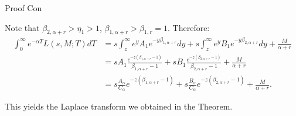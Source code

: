 \documentclass{beamer}
\begin{document}
\begin{frame}{Proof Con}

    {\footnotesize \footnotesize
    \par Note that \(\beta_{2,\alpha+r} > \eta_1 > 1\), \(\beta_{1,\alpha+r} > \beta_{1,r} = 1\). 
    Therefore:
\begin{align*}
\int_{0}^{\infty} e^{-\alpha T} L(s, M; T) dT 
&= s \int_{z}^{\infty} e^{y} A_1 e^{-y\beta_{1,\alpha+r}} dy + s \int_{z}^{\infty} e^{y} B_1 e^{-y\beta_{2,\alpha+r}} dy + \frac{M}{\alpha + r} \\
&= s A_1 \frac{e^{-z(\beta_{1,\alpha+r}-1)}}{\beta_{1,\alpha+r}-1} + s B_1 \frac{e^{-z(\beta_{2,\alpha+r}-1)}}{\beta_{2,\alpha+r}-1} + \frac{M}{\alpha + r} \\
&= s \frac{A_{\alpha}}{C_{\alpha}} e^{-z(\beta_{1,\alpha+r}-1)} + s \frac{B_{\alpha}}{C_{\alpha}} e^{-z(\beta_{2,\alpha+r}-1)} + \frac{M}{\alpha + r}.
\end{align*}

\par This yields the Laplace transform we obtained in the Theorem.


    }
    
\end{frame}
\end{document}
